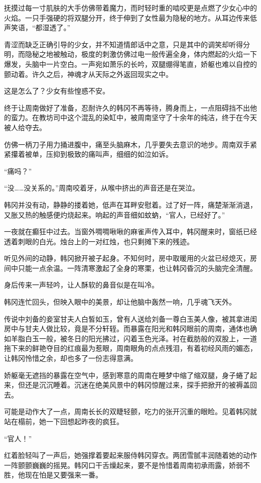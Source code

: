 抚摸过每一寸肌肤的大手仿佛带着魔力，而时轻时重的啮咬更是点燃了少女心中的火焰。一只手强硬的将双腿分开，终于伸到了女性最为隐秘的地方。从耳边传来低声笑语，“都湿透了。”

青涩而缺乏正确引导的少女，并不知道情郎话中之意，只是其中的调笑却听得分明，而隐秘之地被触动，极度的刺激仿佛过电一般传遍全身，体内燃起的火焰一下爆发，头脑中一片空白。一声宛如萧乐的长吟，双腿绷得笔直，娇躯也难以自控的颤动着。许久之后，神魂才从天际之外返回现实之中。

这是怎么了？少女有些惶惑不安。

终于让周南做好了准备，忍耐许久的韩冈不再等待，腾身而上，一点阻碍挡不出他的蛮力。在教坊司中这个混乱的染缸中，被周南坚守了十余年的纯洁，终于在今天被人给夺去。

仿佛一柄刀子用力捅进腹中，痛至头脑麻木，几乎要失去意识的地步。周南双手紧紧攥着被单，压抑到极致的痛叫声，细细的如泣如诉。

“痛吗？”

“没……没关系的。”周南咬着牙，从喉中挤出的声音还是在哭泣。

韩冈并没有动，静静的搂着她，低声在耳畔安慰着。过了好一阵，痛楚渐渐消退，又胀又热的触感便灼烧起来。响起的声音细如蚊蚋，“官人，已经好了。”

一夜就在癫狂中过去。当窗外啁啁啾啾的麻雀声传入耳中，韩冈醒来时，窗纸已经透着刺眼的白光。烛台上的一对红烛，也只剩摊下来的残迹。

听见外间的动静，韩冈掀开被子起身。不知何时，房中取暖用的火盆已经熄灭，房间中只能一点余温。一阵清寒激起了全身的寒栗，也让韩冈昏沉的头脑完全清醒。

身后传来一声轻吟，让人酥软的鼻音似是在叫冷。

韩冈连忙回头，但映入眼中的美景，却让他脑中轰然一响，几乎魂飞天外。

传说中刘备的妾室甘夫人白皙如玉，曾有人送给刘备一尊白玉美人像，被其拿进闺房中与甘夫人做比较，竟是不分轩轾。而暴露在阳光和韩冈眼前的周南，通体也确如羊脂白玉一般，被冬日的阳光拂过，闪着玉色光泽。衬在截肪般的双股上，一道拖下来的鲜艳夺目的红痕最为惹眼，周南眼角的点点残泪，有着初经风雨的媚态，让韩冈怜惜之余，却也多了一份志得意满。

娇躯毫无遮挡的暴露在空气中，感到寒意的周南在睡梦中缩了缩双腿，身子蜷了起来，但还是沉沉睡着。沉迷在绝美风景中的韩冈惊醒过来，探手把掀开的被褥盖回去。

可能是动作大了一点，周南长长的双睫轻颤，吃力的张开沉重的眼睑。见着韩冈就站在榻前，她一下回想起昨夜的疯狂。

“官人！”

红着脸轻叫了一声后，她强撑着要起来服侍韩冈穿衣。两团雪腻丰润随着她的动作一阵颤颤巍巍的摇晃。韩冈口干舌燥起来，要不是怜惜着周南初承雨露，娇弱不胜，他现在怕是又要强来一番。

